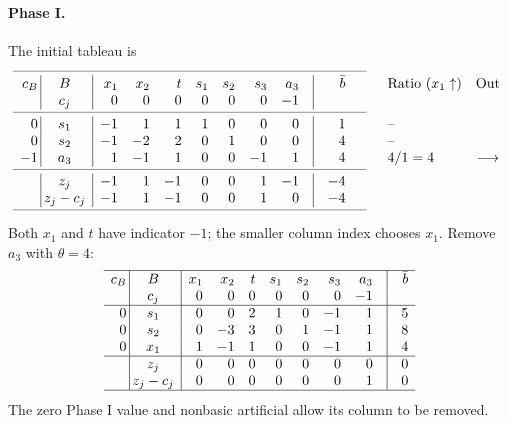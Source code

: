 \documentclass[11pt,a4paper]{article}
\begin{document}
\paragraph{Phase I.}
The initial tableau is
\[
  \begin{array}{r@{\hspace{0.2em}}|@{\hspace{0.2em}}c@{\enspace}|@{\enspace}rrrrrrr@{\quad}|@{\quad}r@{\qquad\quad}l@{\quad}c}\cmidrule(r{1.5em}){1-10}
    c_B & B & x_1 & x_2 & t & s_1 & s_2 & s_3 & a_3 & \bar b & \text{Ratio }(x_1\uparrow) & \text{Out}\\
    & c_j & 0 & 0 & 0 & 0 & 0 & 0 & -1 & & & \\
    \cmidrule(r{1.5em}){1-10}
    0 & s_1 & -1 & 1 & 1 & 1 & 0 & 0 & 0 & 1 & \text{--} & \\
    0 & s_2 & -1 & -2 & 2 & 0 & 1 & 0 & 0 & 4 & \text{--} & \\
    -1 & a_3 & 1 & -1 & 1 & 0 & 0 & -1 & 1 & 4 & 4 / 1=4 & \longrightarrow\\
    \cmidrule(r{1.5em}){1-10}
    & z_j & -1 & 1 & -1 & 0 & 0 & 1 & -1 & -4 & & \\
    & z_j-c_j & -1 & 1 & -1 & 0 & 0 & 1 & 0 & -4 & & \\
    \cmidrule(r{1.5em}){1-10}
  \end{array}
\]
Both $x_1$ and $t$ have indicator $-1$; the smaller column index chooses
$x_1$. Remove $a_3$ with $\theta=4$:
\[
  \begin{array}{r@{\hspace{0.2em}}|@{\hspace{0.2em}}c@{\enspace}|@{\enspace}rrrrrrr@{\quad}|@{\quad}r}\hline
    c_B & B & x_1 & x_2 & t & s_1 & s_2 & s_3 & a_3 & \bar b\\
    & c_j & 0 & 0 & 0 & 0 & 0 & 0 & -1 & \\
    \hline
    0 & s_1 & 0 & 0 & 2 & 1 & 0 & -1 & 1 & 5\\
    0 & s_2 & 0 & -3 & 3 & 0 & 1 & -1 & 1 & 8\\
    0 & x_1 & 1 & -1 & 1 & 0 & 0 & -1 & 1 & 4\\
    \hline
    & z_j & 0 & 0 & 0 & 0 & 0 & 0 & 0 & 0\\
    & z_j-c_j & 0 & 0 & 0 & 0 & 0 & 0 & 1 & 0\\
    \hline
  \end{array}
\]
The zero Phase I value and nonbasic artificial allow its column to be removed.
\end{document}

